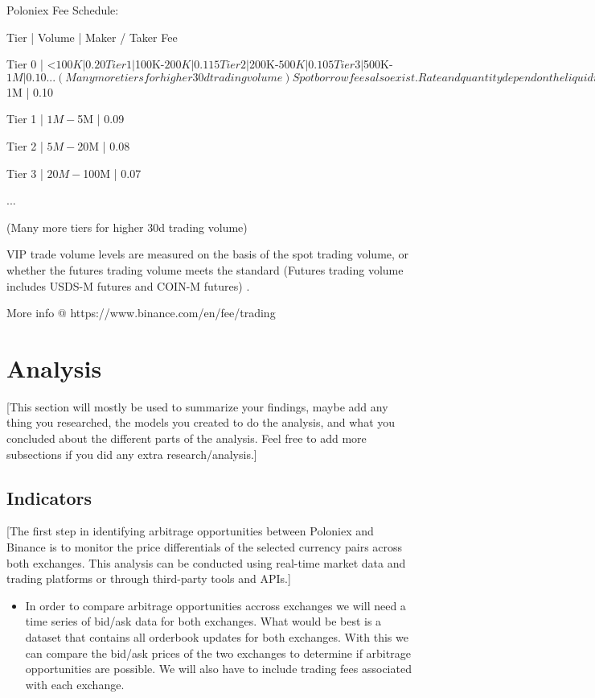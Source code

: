 \documentclass{article}
\begin{document}
Poloniex Fee Schedule:

Tier | Volume | Maker / Taker Fee

Tier 0 | <$100K      | 0.20%

Tier 1 | $100K-$200K | 0.115%

Tier 2 | $200K-$500K | 0.105%

Tier 3 | $500K-$1M   | 0.10%

...

(Many more tiers for higher 30d trading volume)

Spot borrow fees also exist. Rate and quantity depend on the liquidity and short interest of the token.

Borrow fees are paid hourly.

More info @ https://poloniex.com/profile/fee-tier/spot-trading



Binance Fee Schedule:

Tier       Volume     Maker/Taker Fee

Tier 0 | <$1M       | 0.10%

Tier 1 | $1M-$5M    | 0.09%

Tier 2 | $5M-$20M   | 0.08%

Tier 3 | $20M-$100M | 0.07%

...

(Many more tiers for higher 30d trading volume)

VIP trade volume levels are measured on the basis of the spot trading volume, or whether the futures trading volume meets the standard (Futures trading volume includes USDS-M futures and COIN-M futures) .

More info @ https://www.binance.com/en/fee/trading


\section{Analysis}
[This section will mostly be used to summarize your findings, maybe add any thing you researched, the models you created to do the analysis, and what you concluded about the different parts of the analysis. Feel free to add more subsections if you did any extra research/analysis.]
\subsection{Indicators}
[The first step in identifying arbitrage opportunities between Poloniex and Binance is to monitor the price differentials of the selected currency pairs across both exchanges. This analysis can be conducted using real-time market data and trading platforms or through third-party tools and APIs.]
\begin{itemize}
  \item In order to compare arbitrage opportunities accross exchanges we will need a time series of bid/ask data for both exchanges. What would be best is a dataset that contains all orderbook updates for both exchanges. With this we can compare the bid/ask prices of the two exchanges to determine if arbitrage opportunities are possible. We will also have to include trading fees associated with each exchange.
\end{itemize}
\end{document}
